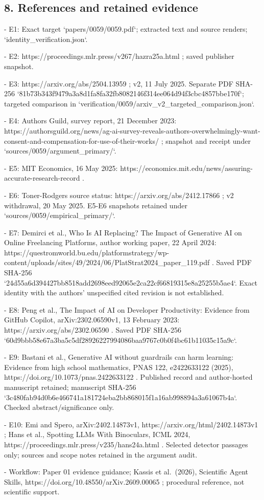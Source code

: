 \documentclass[10pt]{article}
\begin{document}
\subsection*{8. References and retained evidence}
- E1: Exact target `papers/0059/0059.pdf`; extracted text and source renders; `identity\_verification.json`.\par
- E2: https://proceedings.mlr.press/v267/hazra25a.html ; saved publisher snapshot.\par
- E3: https://arxiv.org/abs/2504.13959 ; v2, 11 July 2025. Separate PDF SHA-256 `81b73b343f9479a3a8d1fa8fa32fb8082146f314ee064d94f3cbc4857bbe170f`; targeted comparison in `verification/0059/arxiv\_v2\_targeted\_comparison.json`.\par
- E4: Authors Guild, survey report, 21 December 2023: https://authorsguild.org/news/ag-ai-survey-reveals-authors-overwhelmingly-want-consent-and-compensation-for-use-of-their-works/ ; snapshot and receipt under `sources/0059/argument\_primary/`.\par
- E5: MIT Economics, 16 May 2025: https://economics.mit.edu/news/assuring-accurate-research-record .\par
- E6: Toner-Rodgers source status: https://arxiv.org/abs/2412.17866 ; v2 withdrawal, 20 May 2025. E5-E6 snapshots retained under `sources/0059/empirical\_primary/`.\par
- E7: Demirci et al., Who Is AI Replacing? The Impact of Generative AI on Online Freelancing Platforms, author working paper, 22 April 2024: https://questromworld.bu.edu/platformstrategy/wp-content/uploads/sites/49/2024/06/PlatStrat2024\_paper\_119.pdf . Saved PDF SHA-256 `24d55a6d394427bb8518add2698eed92065e2ca22cf66819315e8a25255b5ae4`. Exact identity with the authors’ unspecified cited revision is not established.\par
- E8: Peng et al., The Impact of AI on Developer Productivity: Evidence from GitHub Copilot, arXiv:2302.06590v1, 13 February 2023: https://arxiv.org/abs/2302.06590 . Saved PDF SHA-256 `60d9bbb58e67a3ba5c5df28926227994086baa9767c0b0f4bc61b11035c15a9c`.\par
- E9: Bastani et al., Generative AI without guardrails can harm learning: Evidence from high school mathematics, PNAS 122, e2422633122 (2025), https://doi.org/10.1073/pnas.2422633122 . Published record and author-hosted manuscript retained; manuscript SHA-256 `3c480fab94d0b6e466741a181724eba2bb868015f1a16ab998894a3a61067b4a`. Checked abstract/significance only.\par
- E10: Emi and Spero, arXiv:2402.14873v1, https://arxiv.org/html/2402.14873v1 ; Hans et al., Spotting LLMs With Binoculars, ICML 2024, https://proceedings.mlr.press/v235/hans24a.html . Selected detector passages only; sources and scope notes retained in the argument audit.\par
- Workflow: Paper 01 evidence guidance; Kassis et al. (2026), Scientific Agent Skills, https://doi.org/10.48550/arXiv.2609.00065 ; procedural reference, not scientific support.\par
\end{document}
